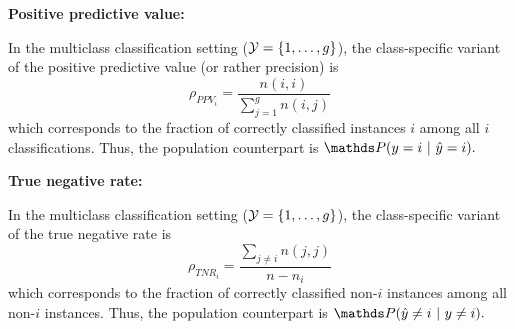\documentclass[a4paper]{article}
\begin{document}
{\begin{enumerate}
	
	\textbf{Positive predictive value:}
	
	In the multiclass classification setting ($\mathcal{Y}=\{1,\ldots,g\}$), the class-specific variant of the positive predictive value (or rather precision) is 
	$$ \rho_{PPV_i} = \frac{n(i,i)}{\sum_{j=1}^g  n(i,j) }$$
	which corresponds to the fraction of correctly classified instances $i$	among all $i$ classifications.
	Thus, the population counterpart is $\P(  y= i ~|~  \yh = i).$ 
	
	
	\textbf{True negative rate:}
	
	In the multiclass classification setting ($\mathcal{Y}=\{1,\ldots,g\}$), the class-specific variant of the true negative rate is 
	$$ \rho_{TNR_i} = \frac{\sum_{j\neq i}  n(j,j) }{ n - n_i }$$
	which corresponds to the fraction of correctly classified non-$i$ instances among all non-$i$ instances.
	Thus, the population counterpart is $\P( \yh \neq i  ~|~  y \neq i ).$ 
  
\end{enumerate}
}
\end{document}
